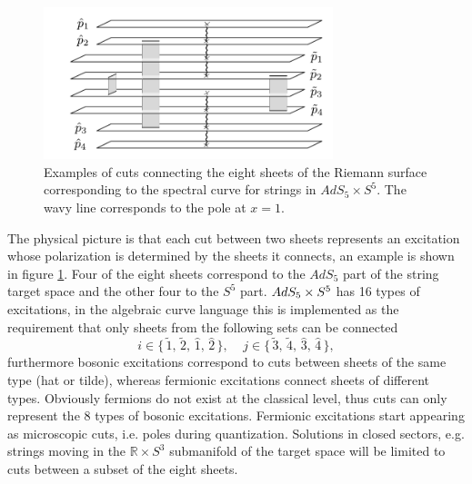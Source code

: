 \begin{figure}[t]
	\centering
		\includegraphics[width=0.75\textwidth]{../graphics/cuts}
	\caption{Examples of cuts connecting the eight sheets of the Riemann surface corresponding to the spectral curve for strings in $AdS_5 \times S^5$. The wavy line corresponds to the pole at $x = 1$.}
	\label{fig:cuts}
\end{figure}

The physical picture is that each cut between two sheets represents an excitation whose polarization is determined by the sheets it connects, an example is shown in figure \ref{fig:cuts}. 
Four of the eight sheets correspond to the $AdS_5$ part of the string target space and the other four to the $S^5$ part. 
$AdS_5 \times S^5$ has 16 types of excitations, in the algebraic curve language this is implemented as the requirement that only sheets from the following sets can be connected
\begin{equation}
	\label{eq:polarizations}
	i \in \{ \, \tilde{1}, \, \tilde{2}, \, \hat{1}, \, \hat{2} \, \}, \;\;\;\; j \in \{ \, \tilde{3}, \, \tilde{4}, \, \hat{3}, \, \hat{4} \, \},
\end{equation}
furthermore bosonic excitations correspond to cuts between sheets of the same type (hat or tilde), whereas fermionic excitations connect sheets of different types. 
Obviously fermions do not exist at the classical level, thus cuts can only represent the 8 types of bosonic excitations.
Fermionic excitations start appearing as microscopic cuts, i.e. poles during quantization. 
Solutions in closed sectors, e.g. strings moving in the $\mathbb{R} \times S^3$ submanifold of the target space will be limited to cuts between a subset of the eight sheets.

